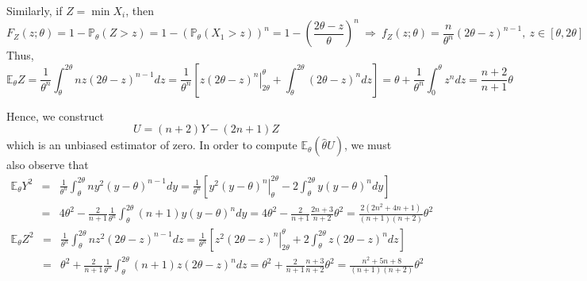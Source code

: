 Similarly, if $Z=\min X_i$, then
\begin{equation}
F_Z(z;\theta) =  1 - \mathbb{P}_\theta (Z > z) = 1- \left(\mathbb{P}_\theta (X_1> z)\right)^n = 1- \left(\frac{2\theta-z}{\theta}\right)^n \ \Rightarrow \ f_Z(z;\theta) =  \frac{n}{\theta^n}\left(2\theta-z\right)^{n-1},\ z\in[\theta,2\theta]
\end{equation}
Thus,
\begin{equation}
\mathbb{E}_\theta Z = \frac{1}{\theta^n} \int^{2\theta}_\theta  nz\left(2\theta-z\right)^{n-1}dz = \frac{1}{\theta^n}\left[z\left.\left(2\theta-z\right)^n\right|_{2\theta}^\theta + \int^{2\theta}_\theta  \left(2\theta-z\right)^ndz\right] = \theta +\frac{1}{\theta^n}\int^{\theta}_0  z^ndz = \frac{n+2}{n+1}\theta
\end{equation}

Hence, we construct
\begin{equation}
U = (n+2)Y - (2n+1)Z
\end{equation}
which is an unbiased estimator of zero. In order to compute $\mathbb{E}_\theta \left(\hat{\theta}U\right) $, we must also observe that
\begin{eqnarray}
\mathbb{E}_\theta Y^2 & = & \frac{1}{\theta^n}\int^{2\theta}_\theta  ny^2\left(y-\theta\right)^{n-1}dy = \frac{1}{\theta^n}\left[y^2\left.\left(y-\theta\right)^n\right|^{2\theta}_\theta - 2\int^{2\theta}_\theta  y\left(y-\theta\right)^ndy\right] \nonumber\\
& = & 4\theta^2 -  \frac{2}{n+1}\frac{1}{\theta^n}\int^{2\theta}_\theta  (n+1)y\left(y-\theta\right)^{n}dy = 4\theta^2 -  \frac{2}{n+1} \frac{2n+3}{n+2}\theta^2 = \frac{2(2n^2+4n+1)}{(n+1)(n+2)}\theta^2
\end{eqnarray}
\begin{eqnarray}
\mathbb{E}_\theta Z^2 & = & \frac{1}{\theta^n}\int^{2\theta}_\theta  nz^2\left(2\theta-z\right)^{n-1}dz = \frac{1}{\theta^n}\left[z^2\left.\left(2\theta-z\right)^n\right|_{2\theta}^\theta + 2\int^{2\theta}_\theta  z\left(2\theta-z\right)^ndz\right]  \nonumber\\
& = & \theta^2 +  \frac{2}{n+1}\frac{1}{\theta^n} \int^{2\theta}_\theta  (n+1)z\left(2\theta-z\right)^{n}dz   = \theta^2 + \frac{2}{n+1} \frac{n+3}{n+2}\theta^2 = \frac{n^2+5n+8}{(n+1)(n+2)}\theta^2
\end{eqnarray}

